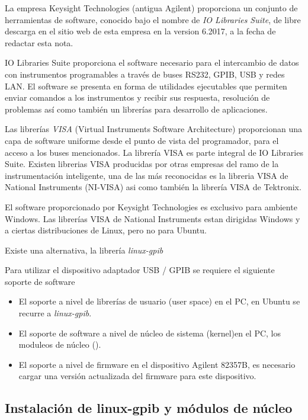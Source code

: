 \documentclass[paper=letter,oneside,fontsize=11pt]{article}
\begin{document}
		La empresa Keysight Technologies (antigua Agilent) proporciona un conjunto de herramientas de software, conocido bajo el nombre de \emph{IO Libraries Suite}, de libre descarga en el sitio web de esta empresa en la version 6.2017, a la fecha de redactar esta nota.
		
		IO Libraries Suite proporciona el software necesario para el intercambio de datos con instrumentos programables a través de buses RS232, GPIB, USB y redes LAN. El software se presenta en forma de utilidades ejecutables que permiten enviar comandos a los instrumentos y recibir sus respuesta, resolución de problemas así como también un librerías para desarrollo de aplicaciones.
		
		Las librerías \emph{VISA} (Virtual Instruments Software Architecture) proporcionan una capa de software uniforme desde el punto de vista del programador, para el acceso a los buses mencionados. La librería VISA es parte integral de IO Libraries Suite. Existen librerias VISA producidas por otras empresas del ramo de la instrumentación inteligente, una de las más reconocidas es la libreria VISA de National Instruments (NI-VISA) asi como también la librería VISA de Tektronix.
		
		El software proporcionado por Keysight Technologies es exclusivo para ambiente Windows. Las librerías VISA de National Instruments estan dirigidas Windows y a ciertas distribuciones de Linux, pero no para Ubuntu.
		
		Existe una alternativa, la librería \emph{linux-gpib} 
		
		Para utilizar el dispositivo adaptador USB / GPIB se requiere el siguiente soporte de software
		
		\begin{itemize}
			\item El soporte a nivel de librerías de usuario (user space) en el PC, en Ubuntu se recurre a \emph{linux-gpib}.
			\item El soporte de software a nivel de núcleo de sistema (kernel)en el PC, los moduleos de núcleo ().
			\item El soporte a nivel de firmware en el dispositivo Agilent 82357B, es necesario cargar una versión actualizada del firmware para este dispositivo.
		\end{itemize}
	
		\subsection{Instalación de linux-gpib y módulos de núcleo}
		
\end{document}
